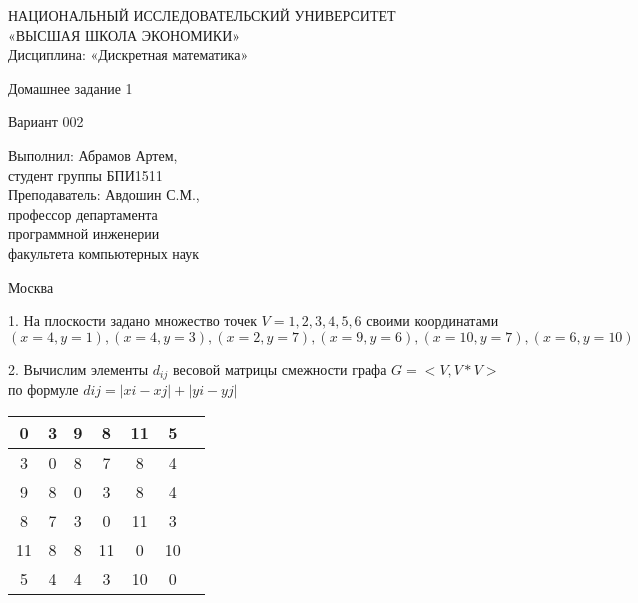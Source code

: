 \documentclass[a4paper,10pt]{article} %
\begin{document}
\begin{titlepage}
\newpage

\begin{center}
{\large НАЦИОНАЛЬНЫЙ ИССЛЕДОВАТЕЛЬСКИЙ УНИВЕРСИТЕТ \\
«ВЫСШАЯ ШКОЛА ЭКОНОМИКИ» \\
Дисциплина: «Дискретная математика»}

\vfill %

{\large Домашнее задание 1}

\bigskip

Вариант 002\\

\vfill

\begin{flushright}
Выполнил: Абрамов Артем,\\
студент группы БПИ1511\medskip \\
Преподаватель: Авдошин С.М., \\
профессор департамента \\
программной инженерии \\
факультета компьютерных наук
\end{flushright}

\vfill

Москва \number\year

\end{center}
\end{titlepage}



1. \quad На плоскости задано множество точек $V = {1, 2, 3, 4, 5, 6}$ своими координатами
$(x = 4,y = 1),(x = 4,y = 3),(x = 2,y = 7),(x = 9,y = 6),(x = 10,y = 7),(x = 6,y = 10)$ \\

\smallskip

2. \quad Вычислим элементы $d_{ij}$ весовой матрицы смежности графа 
$G = <V, V*V>$ по формуле $dij = |xi - xj|  +  |yi - yj|$

\begin{flushleft}\begin{tabular}[]{|c|c|c|c|c|c|c|}
\hline
  0 &    3 &    9 &    8 &   11 &    5 \\
\hline
  3 &    0 &    8 &    7 &    8 &    4 \\
\hline
  9 &    8 &    0 &    3 &    8 &    4 \\
\hline
  8 &    7 &    3 &    0 &   11 &    3 \\
\hline
 11 &    8 &    8 &   11 &    0 &   10 \\
\hline
  5 &    4 &    4 &    3 &   10 &    0 \\
\hline
\end{tabular}
\end{flushleft}
\end{document}
